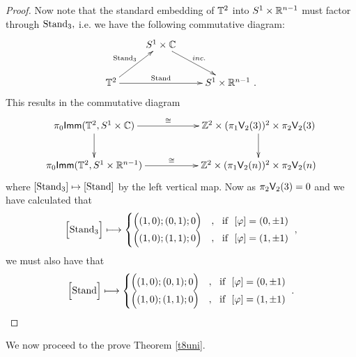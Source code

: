 \begin{proof}
Now note that the standard embedding of $\mathbb T^{2}$ into $S^1 \times \mathbb R^{n - 1}$ must factor through ${\rm Stand}_{3},$ i.e. we have the following commutative diagram:
\[
\xymatrix{
&
S^1 \times \CC \ar[dr]^-{inc.}
&
\\
\TT^{2} \ar[ur]^-{\rm Stand_{3}} \ar[rr]^-{\rm Stand}
&
&
S^1 \times \RR^{n - 1}~.
}
\]
This results in the commutative diagram
\[
\xymatrix{
\pi_{0}{\sf Imm}(\TT^{2}, S^1 \times \CC) \ar[rr]^-{\cong} \ar[d]^-{}
&&
\ZZ^{2} \times (\pi_{1}\sV_{2}(3))^{2} \times \pi_{2}\sV_{2}(3) \ar[d]^-{}
\\
\pi_{0}{\sf Imm}(\TT^{2}, S^1 \times \RR^{n - 1}) \ar[rr]^-{\cong}
&
&
\ZZ^{2} \times (\pi_{1}\sV_{2}(n))^{2} \times \pi_{2}\sV_{2}(n)
}
\]
where $[{\rm Stand}_{3}] \mapsto [{\rm Stand}]$ by the left vertical map. Now as $\pi_{2}\mathsf V_{2}(3) = 0$
and we have calculated that
\[
\Bigl[
{\rm Stand}_{3}
\Bigr]
\longmapsto
\begin{cases}
\Bigl(
(1,0) ; (0,1) ; 0
\Bigr)
&
,
~
\text{ if }~[\varphi] = ( 0,\pm 1)
\\
\Bigl(
(1,0) ; (1,1) ; 0
\Bigr)
&
,
~
\text{ if }~[\varphi] = (1,\pm 1)
\end{cases}~,
\]
we must also have that 
\[
\Bigl[
{\rm Stand}
\Bigr]
\longmapsto
\begin{cases}
\Bigl(
(1,0) ; (0,1) ; 0
\Bigr)
&
,
~
\text{ if }~[\varphi] = ( 0,\pm 1)
\\
\Bigl(
(1,0) ; (1,1) ; 0
\Bigr)
&
,
~
\text{ if }~[\varphi] = (1,\pm 1)
\end{cases}~.
\]

\end{proof}



\begin{remark} \label{prooff}
We now proceed to the prove Theorem \ref{t8uni}.
\end{remark}

